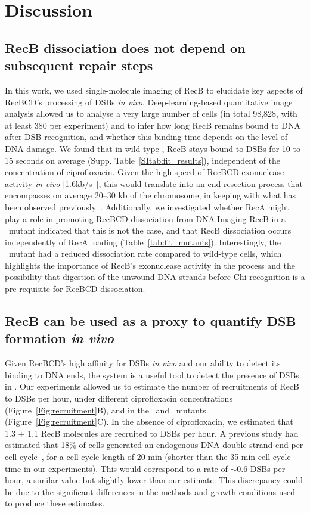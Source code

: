 \section*{Discussion}

\subsection*{RecB dissociation does not depend on subsequent repair steps}
In this work, we used single-molecule imaging of RecB to elucidate key aspects of RecBCD's processing of DSBs \emph{in vivo}. Deep-learning-based quantitative image analysis allowed us to analyse a very large number of cells (in total 98,828, with at least 380 per experiment) and to infer how long RecB remains bound to DNA after DSB recognition, and whether this binding time depends on the level of DNA damage. We found that in wild-type \ecoli, RecB stays bound to DSBs for 10 to 15 seconds on average (Supp. Table~\ref{SItab:fit_results}), independent of the concentration of ciprofloxacin. Given the high speed of RecBCD exonuclease activity \emph{in vivo} [1.6kb/s~\cite{Wiktor2018}], this would translate into an end-resection process that encompasses on average 20--30 kb of the chromosome, in keeping with what has been observed previously~\cite{Cockram2015, Wiktor2018}. Additionally, we investigated whether RecA might play a role in promoting RecBCD dissociation from DNA.\@ Imaging RecB in a \dreca\ mutant indicated that this is not the case, and that RecB dissociation occurs independently of RecA loading (Table~\ref{tab:fit_mutants}). Interestingly, the \geneteneighty\ mutant had a reduced dissociation rate compared to wild-type cells, which highlights the importance of RecB's exonuclease activity in the process and the possibility that digestion of the unwound DNA strands before Chi recognition is a pre-requisite for RecBCD dissociation.

\subsection*{RecB can be used as a proxy to quantify DSB formation \emph{in vivo}}
Given RecBCD's high affinity for DSBs \emph{in vivo} and our ability to detect its binding to DNA ends, the system is a useful tool to detect the presence of DSBs in \ecoli. Our experiments allowed us to estimate the number of recruitments of RecB to DSBs per hour, under different ciprofloxacin concentrations (Figure~\ref{Fig:recruitment}B), and in the \dreca\ and \geneteneighty\ mutants (Figure~\ref{Fig:recruitment}C). In the absence of ciprofloxacin, we estimated that 1.3 $\pm$ 1.1 RecB molecules are recruited to DSBs per hour. A previous study had estimated that 18\% of cells generated an endogenous DNA double-strand end per cell cycle~\cite{Sinha2018}, for a cell cycle length of 20 min (shorter than the 35 min cell cycle time in our experiments). This would correspond to a rate of $\sim$0.6 DSBs per hour, a similar value but slightly lower than our estimate. This discrepancy could be due to the significant differences in the methods and growth conditions used to produce these estimates.

